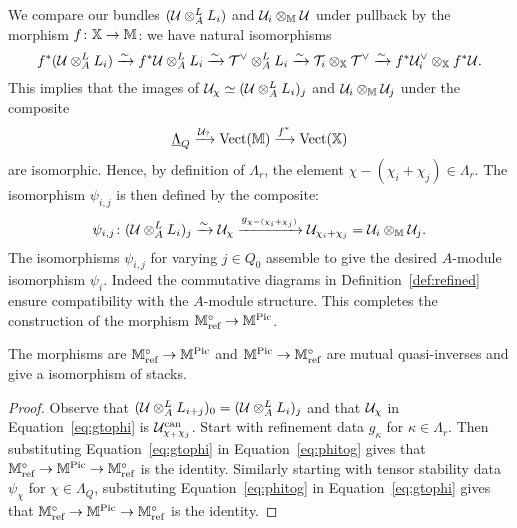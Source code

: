 \documentclass[12pt]{amsart}
\begin{document}
We compare our bundles $(\mathcal{U} \otimes_A^L L_i)$ and $\mathcal{U}_i \otimes_{\mathbb{M}} \mathcal{U}$ under pullback by the morphism $f \colon \mathbb{X} \rightarrow \mathbb{M}$: we have natural isomorphisms
\begin{equation} \label{eq:natisolinebdls}
f^*(\mathcal{U} \otimes_A^L L_i) \xrightarrow{\sim} f^* \mathcal{U} \otimes_A^L L_i \xrightarrow{\sim} 
\mathcal{T}^{\vee} \otimes_A^L L_i \xrightarrow{\sim} \mathcal{T}_i \otimes_{\mathbb{X}} \mathcal{T}^{\vee} \xrightarrow{\sim} 
f^*\mathcal{U}_{i}^{\vee} \otimes_{\mathbb{X}} f^* \mathcal{U}.
\end{equation}
This implies that the images of $\mathcal{U}_\chi \simeq (\mathcal{U} \otimes_A^L L_i)_j$ and $\mathcal{U}_i \otimes_{\mathbb{M}} \mathcal{U}_j$ under the composite $$\underline{\Lambda}_{Q} \xrightarrow{\mathcal{U}_?} \operatorname{Vect}(\mathbb{M}) \xrightarrow{f^*} \operatorname{Vect}(\mathbb{X})$$ are isomorphic.
Hence, by definition of $\Lambda_r$, the element $\chi-(\chi_i+\chi_j) \in \Lambda_r$.
The isomorphism $\psi_{i,j}$ is then defined by the composite:
\begin{equation}\label{eq:gtophi}
\psi_{i,j} \colon (\mathcal{U} \otimes_A^L L_i)_j \xrightarrow{\sim} \mathcal{U}_\chi \xrightarrow{g_{\chi-(\chi_i+\chi_j)}} \mathcal{U}_{\chi_i + \chi_j} = \mathcal{U}_i \otimes_{\mathbb{M}} \mathcal{U}_j.
\end{equation}
The isomorphisms $\psi_{i,j}$ for varying $j \in Q_0$ assemble to give the desired $A$-module isomorphism $\psi_i$. 
Indeed the commutative diagrams in Definition~\ref{def:refined} ensure compatibility with the $A$-module structure. 
This completes the construction of the morphism $\mathbb{M}^\circ_{\text{ref}} \rightarrow \mathbb{M}^{\operatorname{Pic}}$.


\begin{theorem}
The morphisms are $\mathbb{M}^\circ_{\textup{ref}} \rightarrow \mathbb{M}^{\operatorname{Pic}}$ and $\mathbb{M}^{\operatorname{Pic}} \rightarrow \mathbb{M}_\textup{ref}^\circ$ are mutual quasi-inverses and give a isomorphism of stacks. 
\end{theorem}

\begin{proof}
Observe that $(\mathcal{U} \otimes_A^L L_{i+j})_0 = (\mathcal{U} \otimes_A^L L_i)_j$ and that $\mathcal{U}_\chi$ in Equation~\ref{eq:gtophi} is $\mathcal{U}^{\text{can}}_{\chi_+\chi_j}$.
Start with refinement data $g_\kappa$ for $\kappa \in \Lambda_r$.
Then substituting Equation~\ref{eq:gtophi} in Equation~\ref{eq:phitog} gives that $\mathbb{M}^\circ_{\textup{ref}} \rightarrow \mathbb{M}^{\operatorname{Pic}} \rightarrow \mathbb{M}_\textup{ref}^\circ$ is the identity.
Similarly starting with tensor stability data $\psi_\chi$ for $\chi \in \Lambda_Q$, substituting Equation~\ref{eq:phitog} in Equation~\ref{eq:gtophi} gives that $\mathbb{M}^\circ_{\textup{ref}} \rightarrow \mathbb{M}^{\operatorname{Pic}} \rightarrow \mathbb{M}_\textup{ref}^\circ$ is the identity.
\end{proof}
\end{document}
